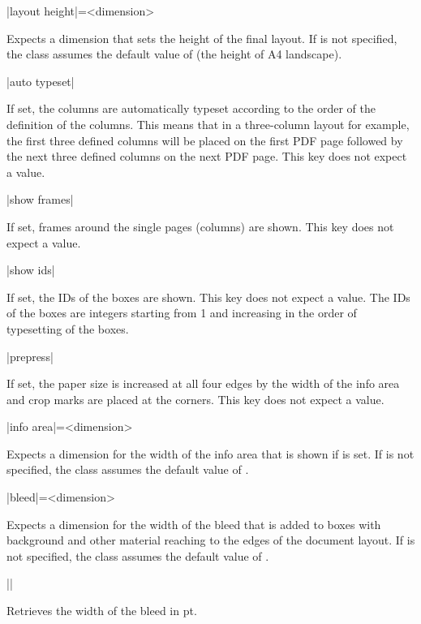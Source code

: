 \documentclass[a4paper]{article}
\begin{document}
\begin{macrodef}
|layout height|={<dimension>}
\end{macrodef}
Expects a dimension that sets the height of the final layout. If  is not specified, the class assumes the default value of \macro{210mm} (the height of A4 landscape).

\begin{macrodef}
|auto typeset|
\end{macrodef}
If set, the columns are automatically typeset according to the order of the definition of the columns. This means that in a three-column layout for example, the first three defined columns will be placed on the first PDF page followed by the next three defined columns on the next PDF page. This key does not expect a value.

\begin{macrodef}
|show frames|
\end{macrodef}
If set, frames around the single pages (columns) are shown. This key does not expect a value.

\begin{macrodef}
|show ids|
\end{macrodef}
If set, the IDs of the boxes are shown. This key does not expect a value. The IDs of the boxes are integers starting from 1 and increasing in the order of typesetting of the boxes.

\begin{macrodef}
|prepress|
\end{macrodef}
If set, the paper size is increased at all four edges by the width of the info area and crop marks are placed at the corners. This key does not expect a value.

\begin{macrodef}
|info area|={<dimension>}
\end{macrodef}
Expects a dimension for the width of the info area that is shown if  is set. If  is not specified, the class assumes the default value of \macro{10mm}.

\begin{macrodef}
|bleed|={<dimension>}
\end{macrodef}
Expects a dimension for the width of the bleed that is added to boxes with background and other material reaching to the edges of the document layout. If  is not specified, the class assumes the default value of \macro{3mm}.

\begin{macrodef}
|\leporellobleed|
\end{macrodef}
Retrieves the width of the bleed in pt.
\end{document}
